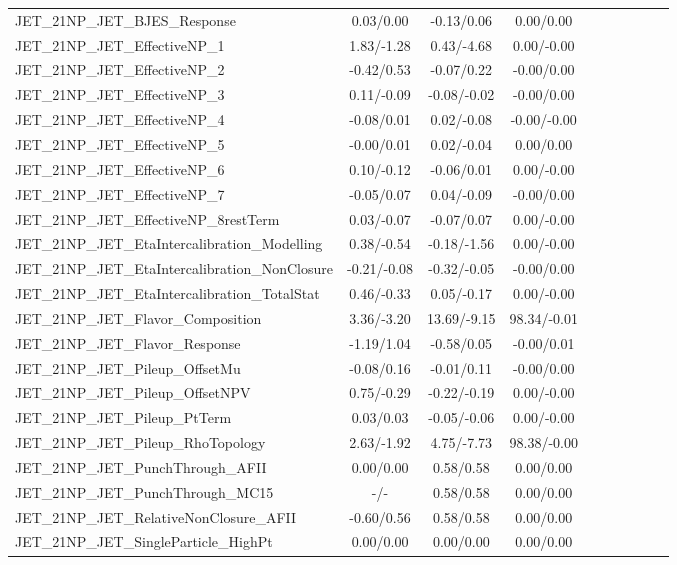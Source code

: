 \begin{table}[h]
\begin{center}
\begin{tabular}{l|ccccccccc}
JET\_21NP\_JET\_BJES\_Response &0.03/0.00 &-0.13/0.06 &0.00/0.00 \\
JET\_21NP\_JET\_EffectiveNP\_1 &1.83/-1.28 &0.43/-4.68 &0.00/-0.00 \\
JET\_21NP\_JET\_EffectiveNP\_2 &-0.42/0.53 &-0.07/0.22 &-0.00/0.00 \\
JET\_21NP\_JET\_EffectiveNP\_3 &0.11/-0.09 &-0.08/-0.02 &-0.00/0.00 \\
JET\_21NP\_JET\_EffectiveNP\_4 &-0.08/0.01 &0.02/-0.08 &-0.00/-0.00 \\
JET\_21NP\_JET\_EffectiveNP\_5 &-0.00/0.01 &0.02/-0.04 &0.00/0.00 \\
JET\_21NP\_JET\_EffectiveNP\_6 &0.10/-0.12 &-0.06/0.01 &0.00/-0.00 \\
JET\_21NP\_JET\_EffectiveNP\_7 &-0.05/0.07 &0.04/-0.09 &-0.00/0.00 \\
JET\_21NP\_JET\_EffectiveNP\_8restTerm &0.03/-0.07 &-0.07/0.07 &0.00/-0.00 \\
JET\_21NP\_JET\_EtaIntercalibration\_Modelling &0.38/-0.54 &-0.18/-1.56 &0.00/-0.00 \\
JET\_21NP\_JET\_EtaIntercalibration\_NonClosure &-0.21/-0.08 &-0.32/-0.05 &-0.00/0.00 \\
JET\_21NP\_JET\_EtaIntercalibration\_TotalStat &0.46/-0.33 &0.05/-0.17 &0.00/-0.00 \\
JET\_21NP\_JET\_Flavor\_Composition &3.36/-3.20 &13.69/-9.15 &98.34/-0.01 \\
JET\_21NP\_JET\_Flavor\_Response &-1.19/1.04 &-0.58/0.05 &-0.00/0.01 \\
JET\_21NP\_JET\_Pileup\_OffsetMu &-0.08/0.16 &-0.01/0.11 &-0.00/0.00 \\
JET\_21NP\_JET\_Pileup\_OffsetNPV &0.75/-0.29 &-0.22/-0.19 &0.00/-0.00 \\
JET\_21NP\_JET\_Pileup\_PtTerm &0.03/0.03 &-0.05/-0.06 &0.00/-0.00 \\
JET\_21NP\_JET\_Pileup\_RhoTopology &2.63/-1.92 &4.75/-7.73 &98.38/-0.00 \\
JET\_21NP\_JET\_PunchThrough\_AFII &0.00/0.00 &0.58/0.58 &0.00/0.00 \\
JET\_21NP\_JET\_PunchThrough\_MC15 &-/- &0.58/0.58 &0.00/0.00 \\
JET\_21NP\_JET\_RelativeNonClosure\_AFII &-0.60/0.56 &0.58/0.58 &0.00/0.00 \\
JET\_21NP\_JET\_SingleParticle\_HighPt &0.00/0.00 &0.00/0.00 &0.00/0.00 \\
\hline
\end{tabular}
\end{center}
\end{table}
